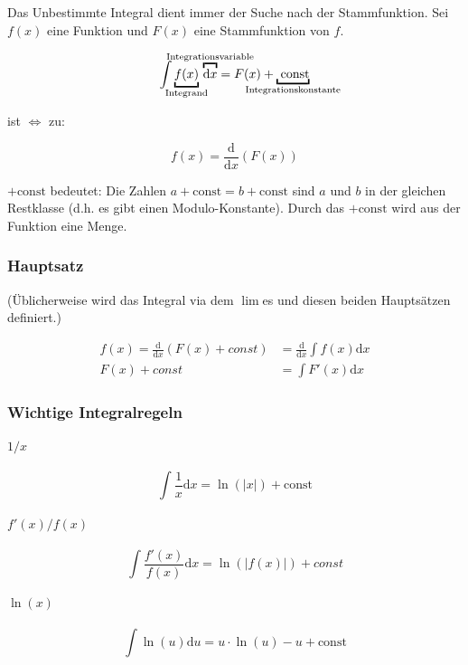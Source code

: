 Das Unbestimmte Integral dient immer der Suche nach der Stammfunktion.
Sei $f(x)$ eine Funktion und $F(x)$ eine Stammfunktion von $f$.

 \[
 \int \underbracket{f(x)}_{\mathclap{\text{Integrand}}}\, \overbracket{\mathrm{d}x}^{\mathclap{\text{Integrationsvariable}}} = F(x) + \underbracket{\text{ const}}_{\mathclap{\text{Integrationskonstante}}}
 \]
 
 ist $\Leftrightarrow$ zu:
 
 \[
	 f(x) = \frac{\mathrm{d}}{\mathrm{d}x}(F(x))
 \]


$+\text{const}$ bedeutet: Die Zahlen $a + \text{const} = b + \text{const}$ sind $a$ und $b$ in der gleichen Restklasse (d.h. es gibt einen Modulo-Konstante). Durch das $+\text{const}$ wird aus der Funktion eine Menge.

\subsubsection{Hauptsatz}

(Üblicherweise wird das Integral via dem $\lim$es und diesen beiden Hauptsätzen definiert.)

\begin{align*}
	f(x) = \frac{\mathrm{d}}{\mathrm{d}x} (F(x) + const) &= \frac{\mathrm{d}}{\mathrm{d}x} \int f(x)\mathrm{d}x \\
	F(x) + const &= \int F'(x) \mathrm{d}x
\end{align*}

\subsubsection{Wichtige Integralregeln}

\paragraph{$1/x$}
\[
	\int \frac{1}{x}\mathrm{d}x = \ln(|x|) + \mathrm{const}
\]

\paragraph{$f'(x) / f(x)$}
\[
	\int \frac{f'(x)}{f(x)}\mathrm{d}x = \ln(\left| f(x) \right|) + const
\]

\paragraph{$\ln(x)$}
\[
	\int \ln(u) \mathrm{ d}u = u \cdot \ln(u) - u + \text{const}
\]

